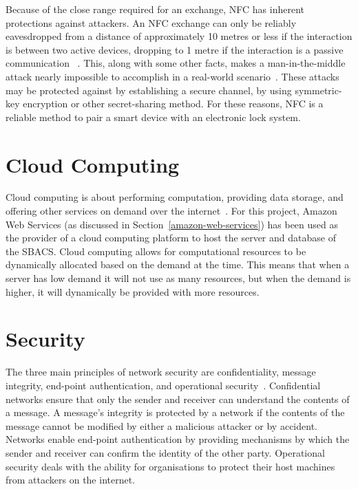\documentclass[12pt]{report}
\let\Oldsection\section
\renewcommand{\section}{\FloatBarrier\Oldsection}
\begin{document}
Because of the close range required for an exchange, NFC has inherent protections against attackers. An NFC exchange
can only be reliably eavesdropped from a distance of approximately 10 metres or less if the interaction is between two 
active devices, dropping to 1 metre if the interaction is a passive communication ~\autocite{NFCSECURITY}. This, along 
with some other facts, makes a man-in-the-middle attack nearly impossible to accomplish in a real-world 
scenario~\autocite{NFCSECURITY}. These attacks may be protected against by establishing a secure channel, by using 
symmetric-key encryption or other secret-sharing method. For these reasons, NFC is a reliable method to pair a smart 
device with an electronic lock system.


\section{Cloud Computing} \label{cloud-computing}

Cloud computing is about performing computation, providing data storage, and offering other services
on demand over the internet~\autocite{CLOUDCOMPUTING}. For this project, Amazon Web Services (as discussed
in Section~\ref{amazon-web-services})
has been used as the provider of a cloud computing platform to host the server and database of the SBACS.
Cloud computing allows for computational resources to be dynamically allocated based on the demand
at the time. This means that when a server has low demand it will not use as many resources, but when
the demand is higher, it will dynamically be provided with more resources.


\section{Security} \label{security}

The three main principles of network security are confidentiality, message integrity, end-point authentication, and
operational security~\autocite{NETWORKTEXTBOOK}. Confidential networks ensure that only the sender and receiver can
understand the contents of a message. A message's integrity is protected by a network if the contents of the message
cannot be modified by either a malicious attacker or by accident. Networks enable end-point authentication by providing
mechanisms by which the sender and receiver can confirm the identity of the other party. Operational security deals with
the ability for organisations to protect their host machines from attackers on the internet.
\end{document}
